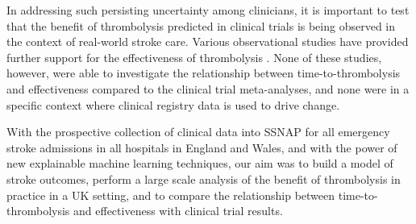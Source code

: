 
In addressing such persisting uncertainty among clinicians, it is important to test that the benefit of thrombolysis predicted in clinical trials is being observed in the context of real-world stroke care. Various observational studies have provided further support for the effectiveness of thrombolysis \cite{wahlgren_thrombolysis_2007, wahlgren_thrombolysis_2008}. None of these studies, however, were able to investigate the relationship between time-to-thrombolysis and effectiveness compared to the clinical trial meta-analyses, and none were in a specific context where clinical registry data is used to drive change.

With the prospective collection of clinical data into SSNAP for all emergency stroke admissions in all hospitals in England and Wales, and with the power of new explainable machine learning techniques, our aim was to build a model of stroke outcomes, perform a large scale analysis of the benefit of thrombolysis in practice in a UK setting, and to compare the relationship between time-to-thrombolysis and effectiveness with clinical trial results.